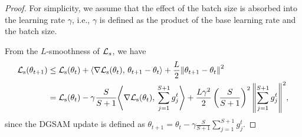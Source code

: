 \documentclass{article}
\theoremstyle{plain}
\theoremstyle{definition}
\theoremstyle{remark}
\newcommand{\ip}[2]{{\left\langle #1, \, #2 \right\rangle}}
\newcommand{\no}[1]{{\left\lVert #1 \right\rVert}}
\begin{document}
\begin{proof}
    For simplicity, we assume that the effect of the batch size is absorbed into the learning rate \(\gamma\), i.e., \(\gamma\) is defined as the product of the base learning rate and the batch size.

    From the $L$-smoothness of ${\mathcal{L}}_s$, we have 
    \begin{align*}
        \gL_{\text{s}}(\theta_{t+1})&\leq \gL_{\text{s}}(\theta_t)+\ip{\nabla \gL_{\text{s}}(\theta_t)}{\theta_{t+1}-\theta_t}+\frac{L}{2}\no{\theta_{t+1}-\theta_t}^2 \\
        &= \gL_{\text{s}}(\theta_t)-\gamma\frac{S}{S+1}\ip{\nabla \gL_{\text{s}}(\theta_t)}{\sum\limits_{j=1}^{S+1}g_j^t}+\frac{L\gamma^2}{2}\left(\frac{S}{S+1}\right)^2\no{\sum\limits_{j=1}^{S+1}g_j^t}^2, 
    \end{align*}
    since the DGSAM update is defined as \(\theta_{t+1} = \theta_t - \gamma\frac{S}{S+1}\sum\limits_{j=1}^{S+1}g_j^t\).


\end{proof}
\end{document}
